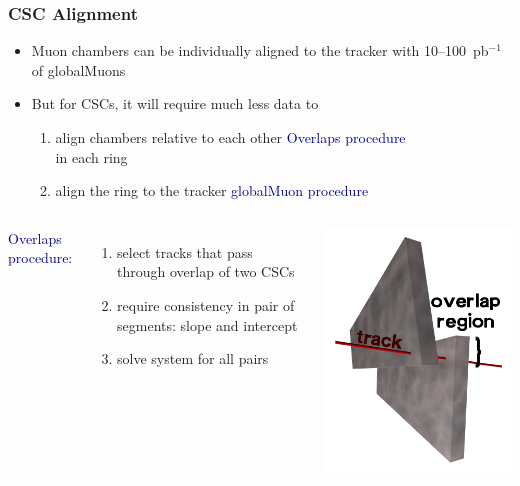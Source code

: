 \documentclass[compress]{beamer}
\begin{document}
\begin{frame}
\frametitle{CSC Alignment}
\begin{itemize}
\item Muon chambers can be individually aligned to the tracker with 10--100~pb$^{-1}$ of globalMuons
\item But for CSCs, it will require much less data to
\begin{enumerate}
\item align chambers relative to each other \hfill \textcolor{darkblue}{Overlaps procedure} \\ in each ring
\item align the ring to the tracker \hfill \textcolor{darkblue}{globalMuon procedure}
\end{enumerate}
\end{itemize}

\begin{columns}
\textcolor{darkblue}{Overlaps procedure:}
\begin{enumerate}\setlength{\itemsep}{0 cm}
\item select tracks that pass through overlap of two CSCs
\item require consistency in pair of segments: slope and intercept
\item solve system for all pairs
\end{enumerate}

\includegraphics[width=\linewidth]{overlaps.png}


\end{columns}
\end{frame}
\end{document}
